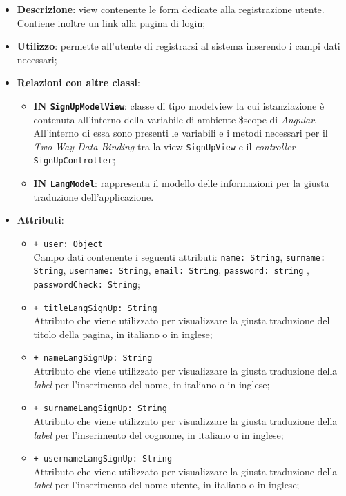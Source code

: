 \begin{itemize}
	\item \textbf{Descrizione}: view contenente le form dedicate alla registrazione utente. Contiene inoltre un link alla pagina di login;
	\item \textbf{Utilizzo}: permette all'utente di registrarsi al sistema inserendo i campi dati necessari;
	\item \textbf{Relazioni con altre classi}:
	\begin{itemize}
		\item \textbf{IN \texttt{SignUpModelView}}: classe di tipo modelview la cui istanziazione è contenuta all'interno della variabile di ambiente \$scope di \textit{Angular}. All'interno di essa sono presenti le variabili e i metodi necessari per il \textit{Two-Way Data-Binding} tra la view \texttt{SignUpView} e il \textit{controller} \texttt{SignUpController};
		\item \textbf{IN \texttt{LangModel}}: rappresenta il modello delle informazioni per la giusta traduzione dell'applicazione.
	\end{itemize}
	\item \textbf{Attributi}:
	\begin{itemize}
		\item \texttt{+ user: Object} \\ Campo dati contenente i seguenti attributi: \texttt{name: String}, \texttt{surname: String}, \texttt{username: String}, \texttt{email: String}, \texttt{password: string} , \\ \texttt{passwordCheck: String};
		\item \texttt{+ titleLangSignUp: String} \\ Attributo che viene utilizzato per visualizzare la giusta traduzione del titolo della pagina, in italiano o in inglese;
		\item \texttt{+ nameLangSignUp: String} \\ Attributo che viene utilizzato per visualizzare la giusta traduzione della \textit{label} per l'inserimento del nome, in italiano o in inglese;
		\item \texttt{+ surnameLangSignUp: String} \\ Attributo che viene utilizzato per visualizzare la giusta traduzione della \textit{label} per l'inserimento del cognome, in italiano o in inglese;
		\item \texttt{+ usernameLangSignUp: String} \\ Attributo che viene utilizzato per visualizzare la giusta traduzione della \textit{label} per l'inserimento del nome utente, in italiano o in inglese;

\end{itemize}
\end{itemize}
